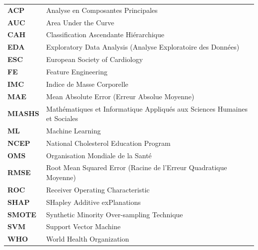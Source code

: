 
\begin{tabular}{@{}ll}
\textbf{ACP}      & Analyse en Composantes Principales \\
\textbf{AUC}      & Area Under the Curve \\
\textbf{CAH}      & Classification Ascendante Hiérarchique \\
\textbf{EDA}      & Exploratory Data Analysis (Analyse Exploratoire des Données) \\
\textbf{ESC}      & European Society of Cardiology \\
\textbf{FE}       & Feature Engineering \\
\textbf{IMC}      & Indice de Masse Corporelle \\
\textbf{MAE}      & Mean Absolute Error (Erreur Absolue Moyenne) \\
\textbf{MIASHS}   & Mathématiques et Informatique Appliqués aux Sciences Humaines et Sociales \\
\textbf{ML}       & Machine Learning \\
\textbf{NCEP}     & National Cholesterol Education Program \\
\textbf{OMS}      & Organisation Mondiale de la Santé \\
\textbf{RMSE}     & Root Mean Squared Error (Racine de l'Erreur Quadratique Moyenne) \\
\textbf{ROC}      & Receiver Operating Characteristic \\
\textbf{SHAP}     & SHapley Additive exPlanations \\
\textbf{SMOTE}    & Synthetic Minority Over-sampling Technique \\
\textbf{SVM}      & Support Vector Machine \\
\textbf{WHO}      & World Health Organization \\
\end{tabular}

\newpage
